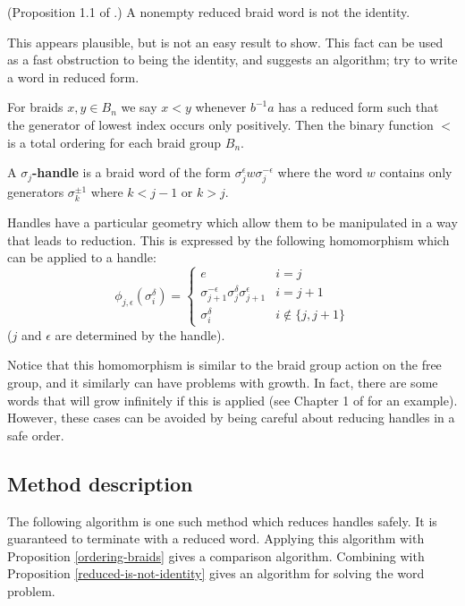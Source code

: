 \documentclass[12pt]{thesis}
\begin{document}
\begin{proposition} (Proposition 1.1 of \cite{dehornoy}.)
    \label{reduced-is-not-identity}
    A nonempty reduced braid word is not the identity.
\end{proposition}
This appears plausible, but is not an easy result to show. 
This fact can be used as a fast obstruction
to being the identity, and suggests an algorithm;
try to write a word in reduced form.

\begin{proposition}
    \label{ordering-braids}
    For braids $x, y \in B_{n}$ we say $x < y$ 
    whenever $b^{-1}a$ has a reduced form such that the 
    generator of lowest index occurs only positively.
    Then the binary function $<$ is a total ordering for each braid group $B_{n}$.
\end{proposition}

\begin{definition}
    A \textbf{$\sigma_{j}$-handle} is a braid word of the form $\sigma_{j}^{\epsilon}w\sigma_{j}^{-\epsilon}$
    where the word $w$ contains only generators $\sigma_{k}^{\pm 1}$ where $k < j - 1$ or $k > j$.
\end{definition}

Handles have a particular geometry which allow
them to be manipulated in a way that leads to reduction.
This is expressed by the following homomorphism
which can be applied to a handle:
\[
    \phi_{j, \epsilon}(\sigma_{i}^{\delta}) = \begin{cases}
        e & i = j \\
        \sigma_{j+1}^{-\epsilon} \sigma_{j}^{\delta} \sigma_{j+1}^{\epsilon} & i = j + 1 \\
        \sigma_{i}^{\delta} & i \not\in \{ j, j + 1 \} 
    \end{cases}
\] ($j$ and $\epsilon$ are
determined by the handle).

Notice that this homomorphism is similar to the braid group action on the free group,
and it similarly can have problems with growth.
In fact, there are some words that will grow infinitely if this is applied (see Chapter 1 of \cite{dehornoy} for an example).
However, these cases can be avoided by being careful about 
reducing handles in a safe order.

\subsection{Method description}

The following algorithm is one such method which reduces handles safely.
It is guaranteed to terminate with a reduced word.
Applying this algorithm with Proposition \ref{ordering-braids}
gives a comparison algorithm.
Combining with Proposition \ref{reduced-is-not-identity}
gives an algorithm for solving the word problem.
\end{document}

